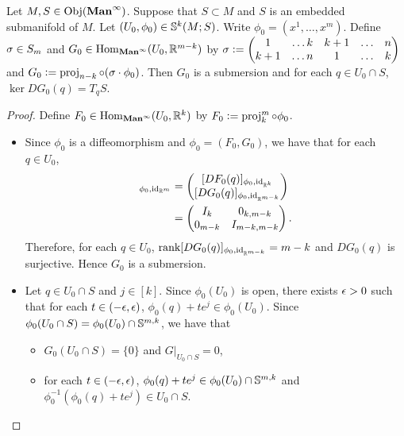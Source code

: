\documentclass{book}
\begin{document}
	\begin{ex} 
		Let $M, S \in \Obj(\Maninf)$. Suppose that $S \subset M$ and $S$ is an embedded submanifold of $M$. Let $(U_0, \phi_0) \in \S^k(M;S)$. Write $\phi_0 = (x^1, \ldots, x^m)$. Define $\sig \in S_m$ and $G_0 \in \Hom_{\Maninf}(U_0, \R^{m-k})$ by $\sig \defeq 
		\begin{pmatrix}
			1   & \ldots k & k+1 &  \ldots &  n \\
			k+1 & \ldots n & 1   &  \ldots &  k
		\end{pmatrix}$ 
		and $G_0 \defeq  \prj_{n-k} \circ (\sig \cdot \phi_0)$.  Then $G_0$ is a submersion and for each $q \in U_0 \cap S$, $\ker DG_0(q) = T_qS$.
	\end{ex}

	\begin{proof}
		Define $F_0 \in \Hom_{\Maninf}(U_0, \R^k)$ by $F_0 \defeq \prj^m_k \circ \phi_0$. 
		\begin{itemize}
			\item Since $\phi_0$ is a diffeomorphism and $\phi_0 = (F_0, G_0)$, we have that for each $q \in U_0$, 
			\begin{align*}
				[D\phi_0(q)]_{\phi_0, \id_{\R^m}} 
				& = 
				\begin{pmatrix}
					[DF_0(q)]_{\phi_0, \id_{\R^k}} \\
					[DG_0(q)]_{\phi_0, \id_{\R^{m-k}}}
				\end{pmatrix} \\
				& = 
				\begin{pmatrix}
					I_{k} & 0_{k, m - k} \\
					0_{m-k} & I_{m-k, m-k}
				\end{pmatrix}.
			\end{align*} 
			Therefore, for each $q \in U_0$, $\rnk [DG_0(q)]_{\phi_0, \id_{\R^{m-k}}} = m-k$ and $DG_0(q)$ is surjective. Hence $G_0$ is a submersion. 
			\item Let $q \in U_0 \cap S$ and $j \in [k]$. Since $\phi_0(U_0)$ is open, there exists $\ep >0$ such that for each $t \in (-\ep, \ep)$, $\phi_0(q) + t e^j \in \phi_0(U_0)$. Since $\phi_0(U_0 \cap S) = \phi_0(U_0) \cap \S^{m, k}$, we have that 
			\begin{itemize}
				\item $G_0(U_0 \cap S) = \{0\}$ and $G|_{U_0 \cap S} = 0$,
				\item for each $t \in (-\ep, \ep)$, $\phi_0(q) + t e^j \in \phi_0(U_0) \cap \S^{m,k}$ and $\phi_0^{-1}(\phi_0(q) + t e^j) \in U_0 \cap S$. 

\end{itemize}
\end{itemize}
\end{proof}
\end{document}
